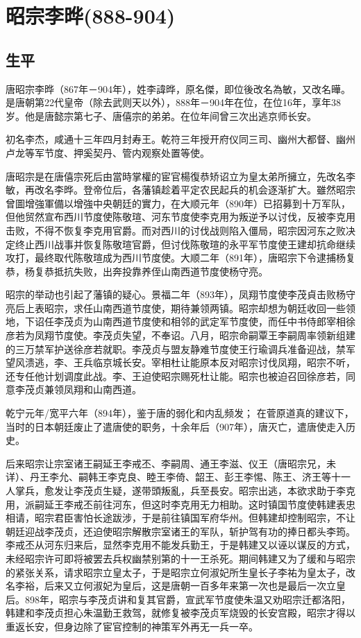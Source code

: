 
\section{昭宗李晔\tiny(888-904)}

\subsection{生平}

唐昭宗李晔（867年－904年），姓李諱晔，原名傑，即位後改名為敏，又改名曄。是唐朝第22代皇帝（除去武则天以外），888年－904年在位，在位16年，享年38岁。他是唐懿宗第七子、唐僖宗的弟弟。在位年间曾三次出逃京师长安。

初名李杰，咸通十三年四月封寿王。乾符三年授开府仪同三司、幽州大都督、幽州卢龙等军节度、押奚契丹、管内观察处置等使。

唐昭宗是在唐僖宗死后由當時掌權的宦官楊復恭矫诏立为皇太弟所擁立，先改名李敏，再改名李晔。登帝位后，各藩镇趁着平定农民起兵的机会逐渐扩大。雖然昭宗曾圖增強軍備以增強中央朝廷的實力，在大顺元年（890年）已招募到十万军队，但他贸然宣布西川节度使陈敬瑄、河东节度使李克用为叛逆予以讨伐，反被李克用击败，不得不恢复李克用官爵。而对西川的讨伐战则陷入僵局，昭宗因河东之败决定终止西川战事并恢复陈敬瑄官爵，但讨伐陈敬瑄的永平军节度使王建却抗命继续攻打，最终取代陈敬瑄成为西川节度使。大顺二年（891年），唐昭宗下令逮捕杨复恭，杨复恭抵抗失败，出奔投靠养侄山南西道节度使杨守亮。

昭宗的举动也引起了藩镇的疑心。景福二年（893年），凤翔节度使李茂貞击败杨守亮后上表昭宗，求任山南西道节度使，期待兼领两镇。昭宗却想为朝廷收回一些领地，下诏任李茂贞为山南西道节度使和相邻的武定军节度使，而任中书侍郎宰相徐彦若为凤翔节度使。李茂贞失望，不奉诏。八月，昭宗命嗣覃王李嗣周率领新组建的三万禁军护送徐彦若就职。李茂贞与盟友静难节度使王行瑜调兵准备迎战，禁军望风溃逃，李、王兵临京城长安。宰相杜让能原本反对昭宗讨伐凤翔，昭宗不听，还专任他计划调度此战。李、王迫使昭宗赐死杜让能。昭宗也被迫召回徐彦若，同意李茂贞兼领凤翔和山南西道。

乾宁元年/宽平六年（894年），鉴于唐的弱化和内乱频发； 在菅原道真的建议下，当时的日本朝廷废止了遣唐使的职务，十余年后（907年），唐灭亡，遣唐使走入历史。

后来昭宗让宗室诸王嗣延王李戒丕、李嗣周、通王李滋、仪王（唐昭宗兄，未详）、丹王李允、嗣韩王李克良、睦王李倚、韶王、彭王李惕、陈王、济王等十一人掌兵，愈发让李茂贞生疑，遂带頭叛亂，兵至長安。昭宗出逃，本欲求助于李克用，派嗣延王李戒丕前往河东，但这时李克用无力相助。这时镇国节度使韩建表忠相请，昭宗君臣害怕长途跋涉，于是前往镇国军府华州。但韩建却控制昭宗，不让朝廷迎战李茂贞，还迫使昭宗解散宗室诸王的军队，斩护驾有功的捧日都头李筠。李戒丕从河东归来后，显然李克用不能发兵勤王，于是韩建又以诬以谋反的方式，未经昭宗许可即将被罢去兵权幽禁别第的十一王杀死。期间韩建又为了缓和与昭宗的紧张关系，请求昭宗立皇太子，于是昭宗立何淑妃所生皇长子李祐为皇太子，改名李裕，后来又立何淑妃为皇后，这是唐朝一百多年来第一次也是最后一次立皇后。898年，昭宗与李茂贞讲和复其官爵，宣武军节度使朱温又劝昭宗迁都洛阳，韩建和李茂贞担心朱温勤王救驾，就修复被李茂贞军烧毁的长安宫殿，昭宗才得以重返长安，但身边除了宦官控制的神策军外再无一兵一卒。

